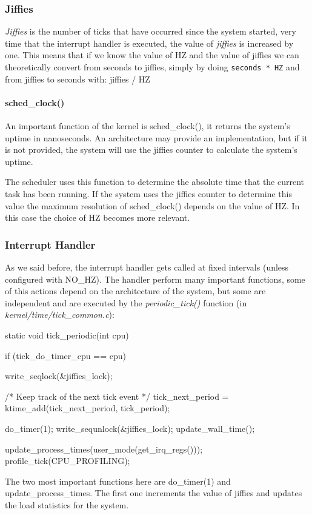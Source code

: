 \documentclass[10pt]{book}
\begin{document}
\subsubsection{Jiffies}
\textit{Jiffies} is the number of ticks that have occurred since the system started, very time that the interrupt handler is executed, the value of \textit{jiffies} is increased by one. This means that if we know the value of HZ and the value of jiffies we can theoretically convert from seconds to jiffies, simply by doing \verb|seconds * HZ| and from jiffies to seconds with: jiffies / HZ

\paragraph{sched\_clock()}

An important function of the kernel is sched\_clock(), it returns the system's uptime in nanoseconds. An architecture may provide an implementation, but if it is not provided, the system will use the jiffies counter to calculate the system's uptime.

The scheduler uses this function to determine the absolute time that the current task has been running. If the system uses the jiffies counter to determine this value the maximum resolution of sched\_clock() depends on the value of HZ. In this case the choice of HZ becomes more relevant.

\subsubsection{Interrupt Handler}

As we said before, the interrupt handler gets called at fixed intervals (unless configured with NO\_HZ). The handler perform many important functions, some of this actions depend on the architecture of the system, but some are independent and are executed by the \textit{periodic\_tick()} function (in \textit{kernel/time/tick\_common.c}):

\begin{code}
static void tick_periodic(int cpu)
{
	if (tick_do_timer_cpu == cpu) {
		write_seqlock(&jiffies_lock);

		/* Keep track of the next tick event */
		tick_next_period = ktime_add(tick_next_period, tick_period);

		do_timer(1);
		write_sequnlock(&jiffies_lock);
		update_wall_time();
	}

	update_process_times(user_mode(get_irq_regs()));
	profile_tick(CPU_PROFILING);
}
\end{code}
The two most important functions here are do\_timer(1) and update\_process\_times. The first one increments the value of jiffies and updates the load statistics for the system.
\end{document}
